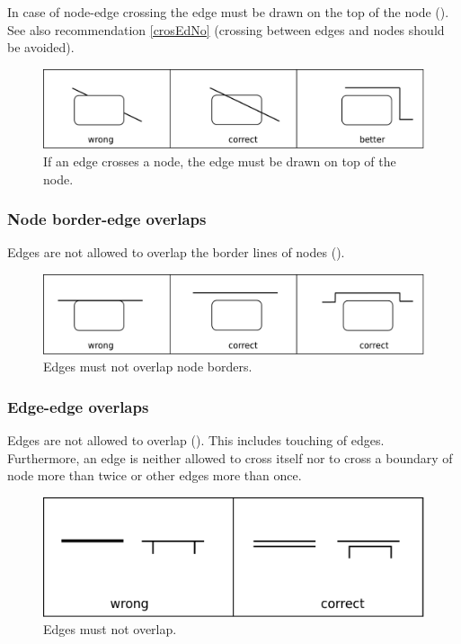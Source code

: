 In case of node-edge crossing the edge must be drawn on the top of
the node (). See also recommendation \ref{crosEdNo} (crossing between
edges and nodes should be avoided).

\begin{figure}[h!]
  \centering
  \includegraphics[scale=0.3]{images/layout-node-edge}
  \caption{If an edge crosses a node, the edge must be drawn on top
  of the node.}\label{fig:layout2}
\end{figure}

\subsubsection{Node border-edge overlaps}

Edges are not allowed to overlap the border lines of nodes ().

\begin{figure}[h!]
  \centering
  \includegraphics[scale=0.3]{images/layout-node-border-edge}
  \caption{Edges must not overlap node borders.}\label{fig:layout3}
\end{figure}

\subsubsection{Edge-edge overlaps}

Edges are not allowed to overlap (). This includes touching of edges.
Furthermore, an edge is neither allowed to cross itself nor to cross
a boundary of node more than twice or other edges more than once.

\begin{figure}[h!]
  \centering
  \includegraphics[scale=0.3]{images/layout-edge-edge}
  \caption{Edges must not overlap.}\label{fig:layout4}
\end{figure}


